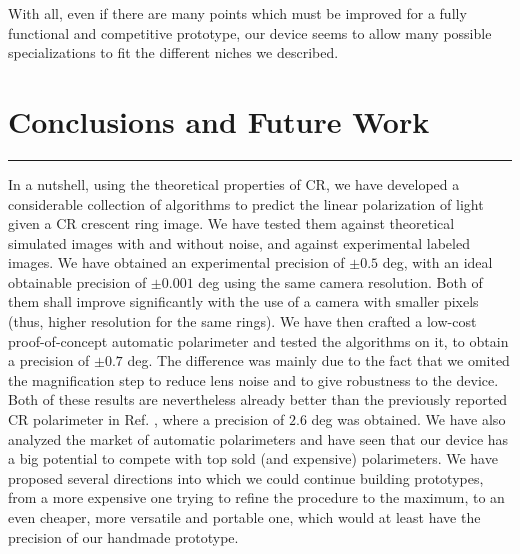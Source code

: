 \documentclass[11pt, a4paper, twoside]{article} %
\begin{document}
With all, even if there are many points which must be improved for a fully functional and competitive prototype, our device seems to allow many possible specializations to fit the different niches we described.


\newpage
\fancyhead[L]{\null}
\fancyhead[R]{\null}











\section*{\centering \huge{ Conclusions and Future Work}\vspace{-0.44cm}}
\noindent\rule{\textwidth}{0.4pt}


In a nutshell, using the theoretical properties of CR, we have developed a considerable collection of algorithms to predict the linear polarization of light given a CR crescent ring image. We have tested them against theoretical simulated images with and without noise, and against experimental labeled images. We have obtained an experimental precision of $\pm 0.5$ deg, with an ideal obtainable precision of $\pm 0.001$ deg using the same camera resolution. Both of them shall improve significantly with the use of a camera with smaller pixels (thus, higher resolution for the same rings). We have then crafted a low-cost proof-of-concept automatic polarimeter and tested the algorithms on it, to obtain a precision of $\pm0.7$ deg. The difference was mainly due to the fact that we omited the magnification step to reduce lens noise and to give robustness to the device. Both of these results are nevertheless already better than the previously reported CR polarimeter in Ref. \cite{incomplete}, where a precision of $2.6$ deg was obtained. We have also analyzed the market of automatic polarimeters and have seen that our device has a big potential to compete with top sold (and expensive) polarimeters. We have proposed several directions into which we could continue building prototypes, from a more expensive one trying to refine the procedure to the maximum, to an even cheaper, more versatile and portable one, which would at least have the precision of our handmade prototype.\vspace{-0.07cm}
\end{document}

